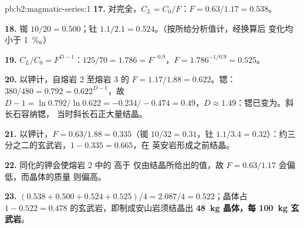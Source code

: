 \begin{solution}{pb:b2:magmatic-series:1}
\textbf{17.} 对完全，$C_L = C_0/F$：$F = 0.63/1.17 =
0.538$。

\textbf{18.} 铷 $10/20 = 0.500$；钍 $1.1/2.1 = 0.524$。（按所给分析值计，经换算后
变化均小于 \qty{1}{\percent}。）

\textbf{19.} $C_L/C_0 = F^{D - 1}$：$125/70 = 1.786 = F^{-0.9}$，$F = 1.786^{-1/0.9} =
0.525$。

\textbf{20.} 以钾计，自熔岩 2 至熔岩 3 的 $F = 1.17/1.88 = 0.622$。锶：
$380/480 = 0.792 = 0.622^{D - 1}$，故 $D - 1 = \ln 0.792/\ln 0.622 = -0.234/-0.474 =
0.49$，$D \approx 1.49$：锶已变为。斜长石容纳锶，
当时斜长石正大量结晶。

\textbf{21.} 以钾计，$F = 0.63/1.88 = 0.335$（铷 $10/32 = 0.31$，钍
$1.1/3.4 = 0.32$）：约三分之二的玄武岩，$1 - 0.335 = 0.665$，在
英安岩形成之前结晶。

\textbf{22.} 同化的钾会使熔岩 2 中的  高于
仅由结晶所给出的值，故 $F = 0.63/1.17$ 会偏低，而晶体的质量
则偏高。

\textbf{23.} $(0.538 + 0.500 + 0.524 + 0.525)/4 = 2.087/4 = 0.522$；晶体占 $1 - 0.522
= 0.478$ 的玄武岩，即制成安山岩须结晶出 \textbf{\qty[text-series-to-math=true]{48}{kg}
晶体，每 \qty{100}{kg} 玄武岩}。
\end{solution}
